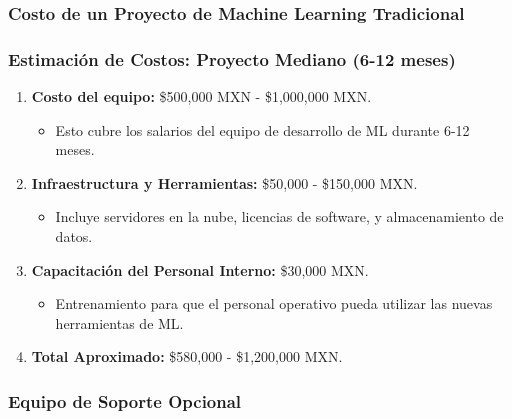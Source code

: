 \documentclass[
  10pt,
  letterpaper,
]{book}
\providecommand{\tightlist}{%
  \setlength{\itemsep}{0pt}\setlength{\parskip}{0pt}}\usepackage{longtable,booktabs,array}
\begin{document}
\subsubsection{\texorpdfstring{\textbf{Costo de un Proyecto de Machine
Learning
Tradicional}}{Costo de un Proyecto de Machine Learning Tradicional}}\label{costo-de-un-proyecto-de-machine-learning-tradicional}

\subsubsection{\texorpdfstring{\textbf{Estimación de Costos: Proyecto
Mediano (6-12
meses)}}{Estimación de Costos: Proyecto Mediano (6-12 meses)}}\label{estimaciuxf3n-de-costos-proyecto-mediano-6-12-meses}

\begin{enumerate}
\def\labelenumi{\arabic{enumi}.}
\tightlist
\item
  \textbf{Costo del equipo:} \$500,000 MXN - \$1,000,000 MXN.

  \begin{itemize}
  \tightlist
  \item
    Esto cubre los salarios del equipo de desarrollo de ML durante 6-12
    meses.
  \end{itemize}
\item
  \textbf{Infraestructura y Herramientas:} \$50,000 - \$150,000 MXN.

  \begin{itemize}
  \tightlist
  \item
    Incluye servidores en la nube, licencias de software, y
    almacenamiento de datos.
  \end{itemize}
\item
  \textbf{Capacitación del Personal Interno:} \$30,000 MXN.

  \begin{itemize}
  \tightlist
  \item
    Entrenamiento para que el personal operativo pueda utilizar las
    nuevas herramientas de ML.
  \end{itemize}
\item
  \textbf{Total Aproximado:} \$580,000 - \$1,200,000 MXN.
\end{enumerate}

\subsubsection{\texorpdfstring{\textbf{Equipo de Soporte
Opcional}}{Equipo de Soporte Opcional}}\label{equipo-de-soporte-opcional}
\end{document}
